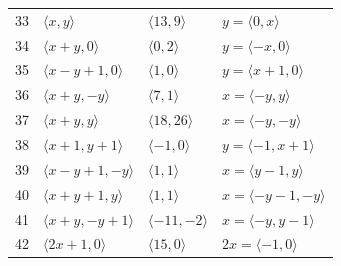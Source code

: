 \documentclass[11pt]{article}
\begin{document}
\begin{longtable}{@{}rlll@{}}
33 & $\langle x,y\rangle$ & $\langle 13,9\rangle$ & $y=\langle 0,x\rangle$\\
34 & $\langle x+y,0\rangle$ & $\langle 0,2\rangle$ & $y=\langle -x,0\rangle$\\
35 & $\langle x-y+1,0\rangle$ & $\langle 1,0\rangle$ & $y=\langle x+1,0\rangle$\\
36 & $\langle x+y,-y\rangle$ & $\langle 7,1\rangle$ & $x=\langle -y,y\rangle$\\
37 & $\langle x+y,y\rangle$ & $\langle 18,26\rangle$ & $x=\langle -y,-y\rangle$\\
38 & $\langle x+1,y+1\rangle$ & $\langle -1,0\rangle$ & $y=\langle -1,x+1\rangle$\\
39 & $\langle x-y+1,-y\rangle$ & $\langle 1,1\rangle$ & $x=\langle y-1,y\rangle$\\
40 & $\langle x+y+1,y\rangle$ & $\langle 1,1\rangle$ & $x=\langle -y-1,-y\rangle$\\
41 & $\langle x+y,-y+1\rangle$ & $\langle -11,-2\rangle$ & $x=\langle -y,y-1\rangle$\\
42 & $\langle 2x+1,0\rangle$ & $\langle 15,0\rangle$ & $2x=\langle -1,0\rangle$\\
\end{longtable}
\endgroup
\end{document}

